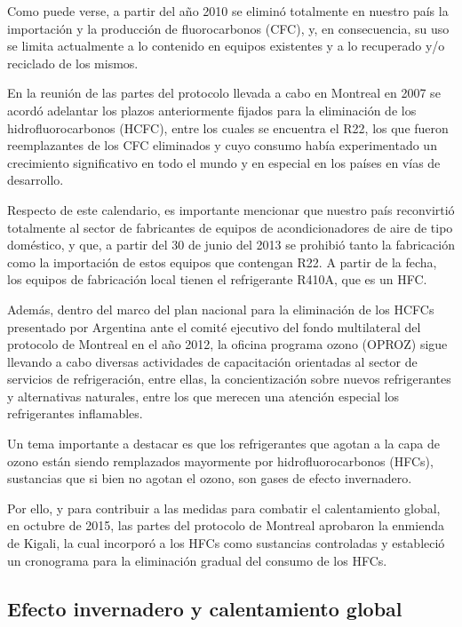 	Como puede verse, a partir del año 2010 se eliminó totalmente en nuestro país la importación y la producción de fluorocarbonos (CFC), y, en consecuencia, su uso se limita actualmente a lo contenido en equipos existentes y a lo recuperado y/o reciclado de los mismos.

	En la reunión de las partes del protocolo llevada a cabo en Montreal en 2007 se acordó adelantar los plazos anteriormente fijados para la eliminación de los hidrofluorocarbonos (HCFC), entre los cuales se encuentra el R22, los que fueron reemplazantes de los CFC eliminados y cuyo consumo había experimentado un crecimiento significativo en todo el mundo y en especial en los países en vías de desarrollo.

	Respecto de este calendario, es importante mencionar que nuestro país reconvirtió totalmente al sector de fabricantes de equipos de acondicionadores de aire de tipo doméstico, y que, a partir del 30 de junio del 2013 se prohibió tanto la fabricación como la importación de estos equipos que contengan R22. A partir de la fecha, los equipos de fabricación local tienen el refrigerante R410A, que es un HFC.

	Además, dentro del marco del plan nacional para la eliminación de los HCFCs presentado por Argentina ante el comité ejecutivo del fondo multilateral del protocolo de Montreal en el año 2012, la oficina programa  ozono (OPROZ) sigue llevando a cabo diversas actividades de capacitación orientadas al sector de servicios de refrigeración, entre ellas, la concientización sobre nuevos refrigerantes y alternativas naturales, entre los que merecen una atención especial los refrigerantes inflamables.

	Un tema importante a destacar es que los refrigerantes que agotan a la capa de ozono están siendo remplazados mayormente por hidrofluorocarbonos (HFCs), sustancias que si bien no agotan el ozono, son gases de efecto invernadero.

	Por ello, y para contribuir a las medidas para combatir el calentamiento global, en octubre de 2015, las partes del protocolo de Montreal aprobaron la enmienda de Kigali, la cual incorporó a los HFCs como sustancias controladas y estableció un cronograma para la eliminación gradual del consumo de los HFCs.

	\subsection{Efecto invernadero y calentamiento global}

